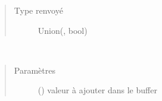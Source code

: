\documentclass[letterpaper,10pt,french]{sphinxmanual}
\begin{document}
\begin{fulllineitems}
\begin{fulllineitems}
\begin{quote}
\begin{description}
\item[{Type renvoyé}] \leavevmode
Union({\hyperref[\detokenize{executeurcomponents:executeurcomponents.DataValue}]{}}, bool)

\end{description}\end{quote}

\end{fulllineitems}


\begin{fulllineitems}
\label{\detokenize{executeurcomponents:executeurcomponents.BufferComponent.write}}~\begin{quote}\begin{description}
\item[{Paramètres}] \leavevmode
{} () \textendash{} valeur à ajouter dans le buffer

\end{description}\end{quote}

\end{fulllineitems}


\end{fulllineitems}

\end{document}
